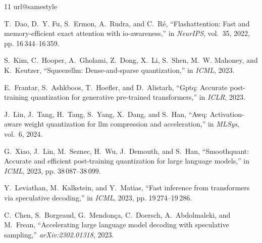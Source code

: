 \documentclass[10pt,journal,compsoc,twocolumn]{IEEEtran}
\begin{document}

\begin{thebibliography}{11}
\providecommand{\url}[1]{#1}
\csname url@samestyle\endcsname
\providecommand{\newblock}{\relax}
\providecommand{\bibinfo}[2]{#2}
\providecommand{\BIBentrySTDinterwordspacing}{\spaceskip=0pt\relax}
\providecommand{\BIBentryALTinterwordstretchfactor}{4}
\providecommand{\BIBentryALTinterwordspacing}{\spaceskip=\fontdimen2\font plus
\BIBentryALTinterwordstretchfactor\fontdimen3\font minus
  \fontdimen4\font\relax}
\providecommand{\BIBforeignlanguage}[2]{{%
\expandafter\ifx\csname l@#1\endcsname\relax
\typeout{** WARNING: IEEEtran.bst: No hyphenation pattern has been}%
\typeout{** loaded for the language `#1'. Using the pattern for}%
\typeout{** the default language instead.}%
\else
\language=\csname l@#1\endcsname
\fi
#2}}
\providecommand{\BIBdecl}{\relax}
\BIBdecl

T.~Dao, D.~Y. Fu, S.~Ermon, A.~Rudra, and C.~R{\'e}, ``Flashattention: Fast and memory-efficient exact attention with io-awareness,'' in \emph{NeurIPS}, vol.~35, 2022, pp. 16\,344--16\,359.

S.~Kim, C.~Hooper, A.~Gholami, Z.~Dong, X.~Li, S.~Shen, M.~W. Mahoney, and K.~Keutzer, ``Squeezellm: Dense-and-sparse quantization,'' in \emph{ICML}, 2023.

E.~Frantar, S.~Ashkboos, T.~Hoefler, and D.~Alistarh, ``Gptq: Accurate post-training quantization for generative pre-trained transformers,'' in \emph{ICLR}, 2023.

J.~Lin, J.~Tang, H.~Tang, S.~Yang, X.~Dang, and S.~Han, ``Awq: Activation-aware weight quantization for llm compression and acceleration,'' in \emph{MLSys}, vol.~6, 2024.

G.~Xiao, J.~Lin, M.~Seznec, H.~Wu, J.~Demouth, and S.~Han, ``Smoothquant: Accurate and efficient post-training quantization for large language models,'' in \emph{ICML}, 2023, pp. 38\,087--38\,099.

Y.~Leviathan, M.~Kalkstein, and Y.~Matias, ``Fast inference from transformers via speculative decoding,'' in \emph{ICML}, 2023, pp. 19\,274--19\,286.

C.~Chen, S.~Borgeaud, G.~Mendon{\c{c}}a, C.~Doersch, A.~Abdolmaleki, and M.~Frean, ``Accelerating large language model decoding with speculative sampling,'' \emph{arXiv:2302.01318}, 2023.


\end{thebibliography}
\end{document}
